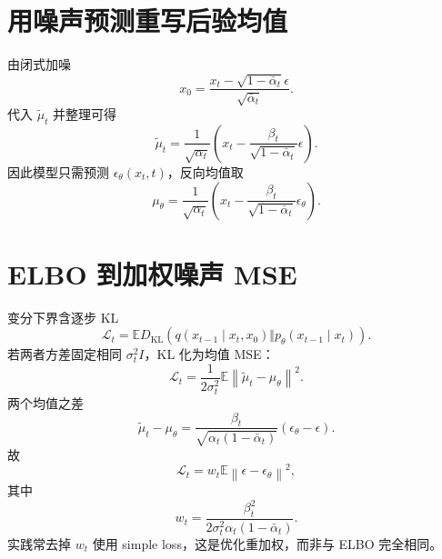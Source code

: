 \documentclass[UTF8,12pt,a4paper,fontset=none]{ctexart}
\numberwithin{equation}{section}
\newcommand{\E}{\mathbb{E}}
\newcommand{\Loss}{\mathcal{L}}
\newcommand{\norm}[1]{\left\lVert #1\right\rVert}
\newcommand{\KL}{D_{\mathrm{KL}}}
\begin{document}
\section{用噪声预测重写后验均值}
由闭式加噪
\begin{equation}
 x_0=\frac{x_t-\sqrt{1-\bar\alpha_t}\epsilon}{\sqrt{\bar\alpha_t}}.
\end{equation}
代入 $\widetilde\mu_t$ 并整理可得
\begin{equation}
 \widetilde\mu_t
 =\frac1{\sqrt{\alpha_t}}
 \left(x_t-\frac{\beta_t}{\sqrt{1-\bar\alpha_t}}\epsilon\right).
\end{equation}
因此模型只需预测 $\epsilon_\theta(x_t,t)$，反向均值取
\begin{equation}
 \mu_\theta
 =\frac1{\sqrt{\alpha_t}}
 \left(x_t-\frac{\beta_t}{\sqrt{1-\bar\alpha_t}}\epsilon_\theta\right).
\end{equation}

\section{ELBO 到加权噪声 MSE}
变分下界含逐步 KL
\begin{equation}
 \Loss_t=\E\KL(q(x_{t-1}\mid x_t,x_0)
 \Vert p_\theta(x_{t-1}\mid x_t)).
\end{equation}
若两者方差固定相同 $\sigma_t^2I$，KL 化为均值 MSE：
\begin{equation}
 \Loss_t=\frac1{2\sigma_t^2}\E\norm{\widetilde\mu_t-\mu_\theta}^2.
\end{equation}
两个均值之差
\begin{equation}
 \widetilde\mu_t-\mu_\theta
 =\frac{\beta_t}{\sqrt{\alpha_t(1-\bar\alpha_t)}}
 (\epsilon_\theta-\epsilon).
\end{equation}
故
\begin{equation}
 \Loss_t=w_t\E\norm{\epsilon-\epsilon_\theta}^2,
\end{equation}
其中
\begin{equation}
 w_t=\frac{\beta_t^2}{2\sigma_t^2\alpha_t(1-\bar\alpha_t)}.
\end{equation}
实践常去掉 $w_t$ 使用 simple loss，这是优化重加权，而非与 ELBO 完全相同。
\end{document}
